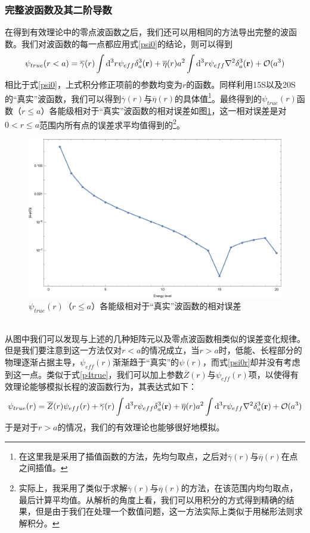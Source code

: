 \documentclass[cs4size,titlepage,twoside]{ctexart}
\begin{document}
\subsubsection{完整波函数及其二阶导数}
在得到有效理论中的零点波函数之后，我们还可以用相同的方法导出完整的波函数。我们对波函数的每一点都应用式\eqref{psi0}的结论，则可以得到
\begin{equation}\label{psi0r}
	\psi_{true}(r<a)=\overline{\gamma}(r)\int\dd^3r\psi_{eff}\delta^3_a(\vb{r})+\overline{\eta}(r)a^2\int\dd^3r\psi_{eff}\laplacian{\delta^3_a(\vb{r})}+\mathcal{O}(a^3)
\end{equation}
相比于式\eqref{psi0}，上式积分修正项前的参数均变为$r$的函数。同样利用15S以及20S的“真实”波函数，我们可以得到$\overline{\gamma}(r)$与$\overline{\eta}(r)$的具体值\footnote{在这里我是采用了插值函数的方法，先均匀取点，之后对$\overline{\gamma}(r)$与$\overline{\eta}(r)$在点之间插值。}。最终得到的$\psi_{true}(r)$函数（$r\leq a$）各能级相对于“真实”波函数的相对误差如图\ref{psir}，这一相对误差是对$0<r\leq a$范围内所有点的误差求平均值得到的\footnote{实际上，我采用了类似于求解$\overline{\gamma}(r)$与$\overline{\eta}(r)$的方法，在该范围内均匀取点，最后计算平均值。从解析的角度上看，我们可以用积分的方式得到精确的结果，但是由于我们在处理一个数值问题，这一方法实际上类似于用梯形法则求解积分。}。
\begin{figure}[!htbp]
	\centering
	\includegraphics[width=6in]{psir1.eps}
	\caption{$\psi_{true}(r)$（$r\leq a$）各能级相对于“真实”波函数的相对误差}\label{psir}
\end{figure}\\
从图中我们可以发现与上述的几种矩阵元以及零点波函数相类似的误差变化规律。但是我们要注意到这一方法仅对$r<a$的情况成立，当$r>a$时，低能、长程部分的物理逐渐占据主导，$\psi_{eff}(r)$渐渐趋于“真实”的$\psi(r)$，而式\eqref{psi0r}却并没有考虑到这一点。类似于式\eqref{p4true}，我们可以加上参数$\overline{Z}(r)$与$\psi_{eff}(r)$项，以使得有效理论能够模拟长程的波函数行为，其表达式如下：
\begin{equation}\label{psi0ra}
	\psi_{true}(r)=\overline{Z}(r)\psi_{eff}(r)+\overline{\gamma}(r)\int\dd^3r\psi_{eff}\delta^3_a(\vb{r})+\overline{\eta}(r)a^2\int\dd^3r\psi_{eff}\laplacian{\delta^3_a(\vb{r})}+\mathcal{O}(a^3)
\end{equation}
于是对于$r>a$的情况，我们的有效理论也能够很好地模拟。
\end{document}
